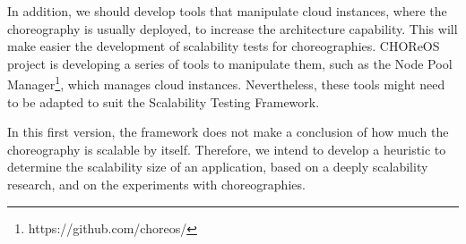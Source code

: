 In addition, we should develop tools that manipulate cloud instances, where the choreography is usually deployed, to increase the architecture capability. This will make easier the development of scalability tests for choreographies. CHOReOS project is developing a series of tools to manipulate them, such as the Node Pool Manager\footnote{https://github.com/choreos/}, which manages cloud instances. Nevertheless, these tools might need to be adapted to suit the Scalability Testing Framework.

In this first version, the framework does not make a conclusion of how much the choreography is scalable by itself. Therefore, we intend to develop a heuristic to determine the scalability size of an application, based on a deeply scalability research, and on the experiments with choreographies.